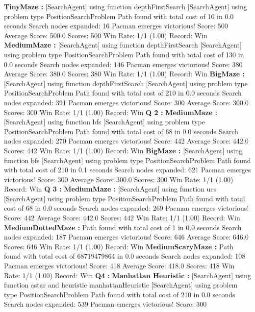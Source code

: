 \documentclass[11pt]{article}
\begin{document}
{\bf TinyMaze :}
[SearchAgent] using function depthFirstSearch
[SearchAgent] using problem type PositionSearchProblem
Path found with total cost of 10 in 0.0 seconds
Search nodes expanded: 16
Pacman emerges victorious! Score: 500
Average Score: 500.0
Scores:        500
Win Rate:      1/1 (1.00)
Record:        Win
{\bf MediumMaze :}
[SearchAgent] using function depthFirstSearch
[SearchAgent] using problem type PositionSearchProblem
Path found with total cost of 130 in 0.0 seconds
Search nodes expanded: 146
Pacman emerges victorious! Score: 380
Average Score: 380.0
Scores:        380
Win Rate:      1/1 (1.00)
Record:        Win
{\bf BigMaze :}
[SearchAgent] using function depthFirstSearch
[SearchAgent] using problem type PositionSearchProblem
Path found with total cost of 210 in 0.0 seconds
Search nodes expanded: 391
Pacman emerges victorious! Score: 300
Average Score: 300.0
Scores:        300
Win Rate:      1/1 (1.00)
Record:        Win
{\bf Q 2 :}
{\bf MediumMaze :}
[SearchAgent] using function bfs
[SearchAgent] using problem type PositionSearchProblem
Path found with total cost of 68 in 0.0 seconds
Search nodes expanded: 270
Pacman emerges victorious! Score: 442
Average Score: 442.0
Scores:        442
Win Rate:      1/1 (1.00)
Record:        Win
{\bf BigMaze :}
[SearchAgent] using function bfs
[SearchAgent] using problem type PositionSearchProblem
Path found with total cost of 210 in 0.1 seconds
Search nodes expanded: 621
Pacman emerges victorious! Score: 300
Average Score: 300.0
Scores:        300
Win Rate:      1/1 (1.00)
Record:        Win
{\bf Q 3 :}
{\bf MediumMaze :}
[SearchAgent] using function ucs
[SearchAgent] using problem type PositionSearchProblem
Path found with total cost of 68 in 0.0 seconds
Search nodes expanded: 269
Pacman emerges victorious! Score: 442
Average Score: 442.0
Scores:        442
Win Rate:      1/1 (1.00)
Record:        Win
{\bf MediumDottedMaze :}
Path found with total cost of 1 in 0.0 seconds
Search nodes expanded: 187
Pacman emerges victorious! Score: 646
Average Score: 646.0
Scores:        646
Win Rate:      1/1 (1.00)
Record:        Win
{\bf MediumScaryMaze :}
Path found with total cost of 68719479864 in 0.0 seconds
Search nodes expanded: 108
Pacman emerges victorious! Score: 418
Average Score: 418.0
Scores:        418
Win Rate:      1/1 (1.00)
Record:        Win
{\bf Q4 :}
{\bf Manhattan Heuristic :}
[SearchAgent] using function astar and heuristic manhattanHeuristic
[SearchAgent] using problem type PositionSearchProblem
Path found with total cost of 210 in 0.0 seconds
Search nodes expanded: 539
Pacman emerges victorious! Score: 300
\end{document}
